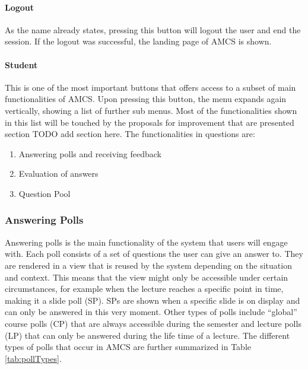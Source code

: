 \documentclass{sigplanconf}
\begin{document}
\paragraph{Logout}

As the name already states, pressing this button will logout the user and end the session. 
If the logout was successful, the landing page of AMCS is shown.

\paragraph{Student}

This is one of the most important buttons that offers access to a subset of main functionalities of AMCS. Upon pressing this button, the menu expands again vertically, showing a list of further sub menus. Most of the functionalities shown in this list will be touched by the proposals for improvement that are presented section TODO add section here. The functionalities in questions are:

\begin{enumerate}
\item Answering polls and receiving feedback
\item Evaluation of answers
\item Question Pool	
\end{enumerate}


\subsubsection{Answering Polls}

Answering polls is the main functionality of the system that users will engage with. Each poll consists of a set of questions the user can give an answer to. They are rendered in a view that is reused  by the system depending on the situation and context. This means that the view might only be accessible under certain circumstances, for example when the lecture reaches a specific point in time, making it a slide poll (SP). SPs are shown when a specific slide is on display and can only be answered in this very moment. Other types of polls include “global” course polls (CP) that are always accessible during the semester and lecture polls (LP) that can only be answered during the life time of a lecture. The different types of polls that occur in AMCS are further summarized in Table \ref{tab:pollTypes}.
\end{document}
